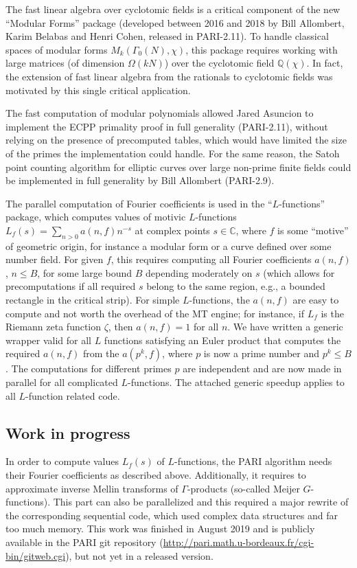 \documentclass{deliverablereport}
\begin{document}
The fast linear algebra over cyclotomic fields is a critical component of the
new ``Modular Forms'' package (developed between 2016 and 2018 by Bill
Allombert, Karim Belabas and Henri Cohen, released in PARI-2.11). To handle
classical spaces of modular forms $M_k(\Gamma_0(N), \chi)$, this package
requires working with large matrices (of dimension $\Omega(kN)$) over the
cyclotomic field $\mathbb{Q}(\chi)$. In fact, the extension of fast linear
algebra from the rationals to cyclotomic fields was motivated by this single
critical application.

The fast computation of modular polynomials allowed Jared Asuncion to
implement the ECPP primality proof in full generality (PARI-2.11), without
relying on the presence of precomputed tables, which would have limited the
size of the primes the implementation could handle. For the same reason, the
Satoh point counting algorithm for elliptic curves over large non-prime
finite fields could be implemented in full generality by Bill Allombert
(PARI-2.9).

The parallel computation of Fourier coefficients is used
in the ``$L$-functions'' package, which computes values of motivic
$L$-functions $L_f(s) = \sum_{n>0} a(n,f) n^{-s}$ at complex points $s\in
\mathbb{C}$, where $f$ is some ``motive'' of geometric origin, for instance a
modular form or a curve defined over some number field. For given $f$, this
requires computing all Fourier coefficients $a(n,f)$, $n \leq B$, for
some large bound $B$ depending moderately on $s$ (which allows for
precomputations if all required $s$ belong to the same region, e.g., a
bounded rectangle in the critical strip). For simple $L$-functions, the
$a(n,f)$ are easy to compute and not worth the overhead of the MT engine; for
instance, if $L_f$ is the Riemann zeta function $\zeta$, then $a(n,f) = 1$
for all $n$. We have written a generic wrapper valid for all $L$ functions
satisfying an Euler product that computes the required $a(n,f)$ from the
$a(p^k,f)$, where $p$ is now a prime number and $p^k\leq B$. The computations
for different primes $p$ are independent and are now made in parallel for all
complicated $L$-functions. The attached generic speedup applies to all
$L$-function related code.


\subsection{Work in progress}

In order to compute values $L_f(s)$ of $L$-functions, the PARI algorithm
needs their Fourier coefficients as described above.
Additionally, it requires to approximate
inverse Mellin transforms of $\Gamma$-products (so-called Meijer
$G$-functions). This part can also be parallelized and this required a major
rewrite of the corresponding sequential code, which used complex data
structures and far too much memory. This work was finished in August 2019 and
is publicly available in the PARI git repository
(\url{http://pari.math.u-bordeaux.fr/cgi-bin/gitweb.cgi}), but not yet
in a released version.
\end{document}
